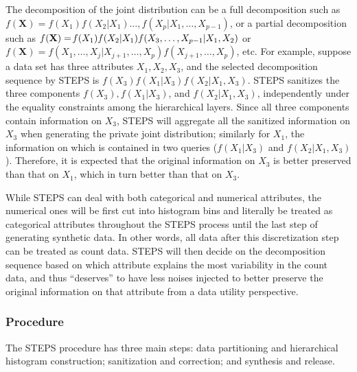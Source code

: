 \documentclass[12pt, A4]{article}
\theoremstyle{plain}
\theoremstyle{exampstyle}\newtheorem{defn}{Definition}
\theoremstyle{exampstyle}\newtheorem{lem}{Lemma}
\theoremstyle{exampstyle}\newtheorem{cor}{Corollary}
\theoremstyle{exampstyle}\newtheorem{pro}{Proposition}
\theoremstyle{exampstyle}\newtheorem{cla}{Claim}
\theoremstyle{exampstyle}\newtheorem{rem}{Remark}
\begin{document}
The decomposition of the joint distribution  can be a full decomposition such as $f(\mathbf{X})=f(X_1)f(X_2|X_1)\ldots, f(X_p|X_1,\ldots,X_{p-1})$, or a partial decomposition such as $f(\mathbf{X})=\!f(X_1) \\ f(X_2|X_1) f(X_3,\ldots,X_{p-1}|X_1,X_2)$ or
$f(\mathbf{X})=\!f(X_1,\ldots,X_j|X_{j+1},\ldots,X_p)f(X_{j+1},\ldots,X_p)$, etc. For example, suppose a data set has three attributes $X_1,X_2,X_3$, and the selected decomposition sequence by STEPS is $f(X_3)f(X_1|X_3)f(X_2|X_1,X_3)$. STEPS sanitizes the three components $f(X_3), f(X_1|X_3)$, and  $f(X_2|X_1,X_3)$, independently under the equality constraints among the hierarchical layers. Since all three components contain information on $X_3$, STEPS will aggregate all the sanitized information on $X_3$ when generating the private joint distribution; similarly for $X_1$, the information on which is contained in two queries ($f(X_1|X_3)$ and  $f(X_2|X_1,X_3)$). Therefore, it is expected that the original information on $X_3$ is better preserved than that on $X_1$, which in turn better than that on $X_3$.

While STEPS can deal with both categorical and numerical attributes, the numerical ones will be first cut into histogram bins and literally be treated as categorical attributes throughout the STEPS process until the last step of generating synthetic data. In other words, all data after this discretization step can be treated as count data. STEPS will then decide on the decomposition sequence based on which attribute explains the most variability in the count data, and thus ``deserves'' to have less noises injected to better preserve the original information on that attribute from a data utility perspective.

\subsubsection{Procedure}
The STEPS procedure has three main steps: data partitioning and hierarchical histogram construction; sanitization and correction; and synthesis and release.
\end{document}
